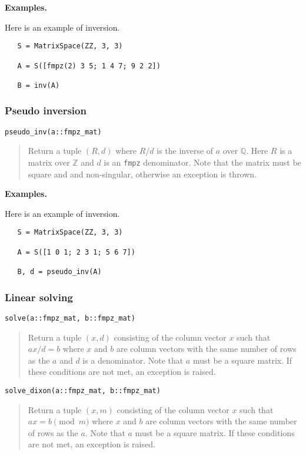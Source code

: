 \documentclass[a4paper,10pt]{article}
\newcommand{\Z}{\mathbb{Z}}
\newcommand{\Q}{\mathbb{Q}}
\newcommand{\code}{\lstinline}
\newcommand{\desc}[1]{\vspace{-3mm}\begin{quote}#1\end{quote}}
\begin{document}
{{\textbf{Examples.}

Here is an example of inversion.

\begin{lstlisting}
   S = MatrixSpace(ZZ, 3, 3)

   A = S([fmpz(2) 3 5; 1 4 7; 9 2 2])
  
   B = inv(A)
\end{lstlisting}

\subsubsection{Pseudo inversion}

\begin{lstlisting}
pseudo_inv(a::fmpz_mat)
\end{lstlisting}

\desc{Return a tuple $(R, d)$ where $R/d$ is the inverse of $a$ over $\Q$.
Here $R$ is a matrix over $\Z$ and $d$ is an \code{fmpz} denominator.
Note that the matrix must be square and and non-singular, otherwise an exception is thrown.}

\textbf{Examples.}

Here is an example of inversion.

\begin{lstlisting}
   S = MatrixSpace(ZZ, 3, 3)

   A = S([1 0 1; 2 3 1; 5 6 7])
  
   B, d = pseudo_inv(A)
\end{lstlisting}

\subsubsection{Linear solving}

\begin{lstlisting}
solve(a::fmpz_mat, b::fmpz_mat)
\end{lstlisting}

\desc{Return a tuple $(x, d)$ consisting of the column vector $x$ such that $ax/d = b$
where $x$ and $b$ are column vectors with the same number of rows as the $a$ and $d$ is
a denominator. Note that $a$ must be a square matrix. If these conditions are not met,
an exception is raised.}

\begin{lstlisting}
solve_dixon(a::fmpz_mat, b::fmpz_mat)
\end{lstlisting}

\desc{Return a tuple $(x, m)$ consisting of the column vector $x$ such that
$ax = b \pmod{m}$ where $x$ and $b$ are column vectors with the same number of rows as
the $a$. Note that $a$ must be a square matrix. If these conditions are not met, an
exception is raised.}

}}
\end{document}
